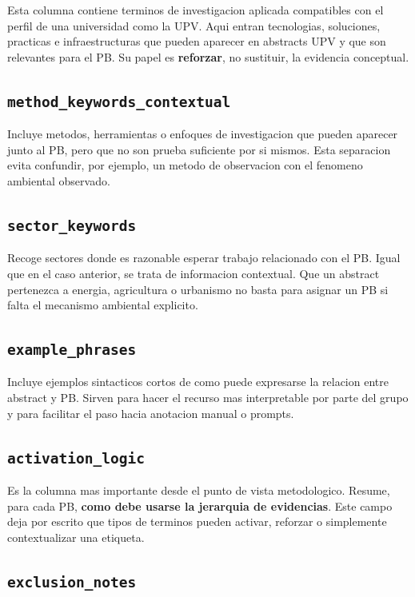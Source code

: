\documentclass[11pt,a4paper]{article}
\begin{document}
Esta columna contiene terminos de investigacion aplicada compatibles con el perfil de una universidad como la UPV. Aqui entran tecnologias, soluciones, practicas e infraestructuras que pueden aparecer en abstracts UPV y que son relevantes para el PB. Su papel es \textbf{reforzar}, no sustituir, la evidencia conceptual.

\subsection{\texttt{method\_keywords\_contextual}}

Incluye metodos, herramientas o enfoques de investigacion que pueden aparecer junto al PB, pero que no son prueba suficiente por si mismos. Esta separacion evita confundir, por ejemplo, un metodo de observacion con el fenomeno ambiental observado.

\subsection{\texttt{sector\_keywords}}

Recoge sectores donde es razonable esperar trabajo relacionado con el PB. Igual que en el caso anterior, se trata de informacion contextual. Que un abstract pertenezca a energia, agricultura o urbanismo no basta para asignar un PB si falta el mecanismo ambiental explicito.

\subsection{\texttt{example\_phrases}}

Incluye ejemplos sintacticos cortos de como puede expresarse la relacion entre abstract y PB. Sirven para hacer el recurso mas interpretable por parte del grupo y para facilitar el paso hacia anotacion manual o prompts.

\subsection{\texttt{activation\_logic}}

Es la columna mas importante desde el punto de vista metodologico. Resume, para cada PB, \textbf{como debe usarse la jerarquia de evidencias}. Este campo deja por escrito que tipos de terminos pueden activar, reforzar o simplemente contextualizar una etiqueta.

\subsection{\texttt{exclusion\_notes}}
\end{document}
